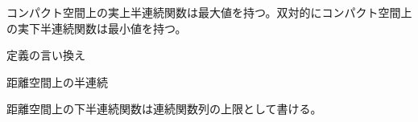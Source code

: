 \documentclass[leqno]{jsarticle}
\begin{document}
{\cor
コンパクト空間上の実上半連続関数は最大値を持つ。双対的にコンパクト空間上の実下半連続関数は最小値を持つ。
}


{\prop[１点での半連続性]
定義の言い換え
}

{\prop 
距離空間上の半連続
}

{\thm
距離空間上の下半連続関数は連続関数列の上限として書ける。
}









			
\end{document}

